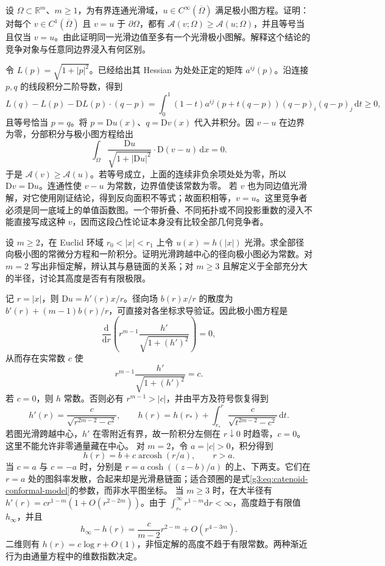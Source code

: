 \begin{exercise}\label{g3:ex:minimal-graph-convex-uniqueness}
	设 \(\Omega\subset\mathbb R^m\)、\(m\ge1\)，为有界连通光滑域，\(u\in C^\infty(\overline\Omega)\) 满足极小图方程。证明：对每个 \(v\in C^1(\overline\Omega)\) 且 \(v=u\) 于 \(\partial\Omega\)，都有 \(\mathcal A(v;\Omega)\ge\mathcal A(u;\Omega)\)，并且等号当且仅当 \(v=u\)。由此证明同一光滑边值至多有一个光滑极小图解。解释这个结论的竞争对象与任意同边界浸入有何区别。
\end{exercise}
\begin{solution}
	令 \(L(p)=\sqrt{1+|p|^2}\)。已经给出其 Hessian 为处处正定的矩阵 \(a^{ij}(p)\)。沿连接 \(p,q\) 的线段积分二阶导数，得到
	\[
		L(q)-L(p)-\mathrm DL(p)\cdot(q-p)
		=\int_0^1(1-t)a^{ij}(p+t(q-p))(q-p)_i(q-p)_j\,\mathrm dt\ge0,
	\]
	且等号恰当 \(p=q\)。将 \(p=\mathrm Du(x)\)、\(q=\mathrm Dv(x)\) 代入并积分。因 \(v-u\) 在边界为零，分部积分与极小图方程给出
	\[
		\int_\Omega\frac{\mathrm Du}{\sqrt{1+|\mathrm Du|^2}}\cdot\mathrm D(v-u)\,\mathrm dx=0.
	\]
	于是 \(\mathcal A(v)\ge\mathcal A(u)\)。若等号成立，上面的连续非负余项处处为零，所以 \(\mathrm Dv=\mathrm Du\)。连通性使 \(v-u\) 为常数，边界值使该常数为零。
	若 \(v\) 也为同边值光滑解，对它使用刚证结论，得到反向面积不等式；故面积相等，\(v=u\)。这里竞争者必须是同一底域上的单值函数图。一个带折叠、不同拓扑或不同投影重数的浸入不能直接写成这种 \(v\)，因而这段凸性论证本身没有比较全部几何竞争者。
\end{solution}

\begin{exercise}\label{g3:ex:radial-minimal-graphs}
	设 \(m\ge2\)，在 Euclid 环域 \(r_0<|x|<r_1\) 上令 \(u(x)=h(|x|)\) 光滑。求全部径向极小图的常微分方程和一阶积分。证明光滑跨越中心的径向极小图必为常数。对 \(m=2\) 写出非恒定解，辨认其与悬链面的关系；对 \(m\ge3\) 且解定义于全部充分大的半径，讨论其高度是否有有限极限。
\end{exercise}
\begin{solution}
	记 \(r=|x|\)，则 \(\mathrm Du=h'(r)x/r\)。径向场 \(b(r)x/r\) 的散度为 \(b'(r)+(m-1)b(r)/r\)，可直接对各坐标求导验证。因此极小图方程是
	\[
		\frac{\mathrm d}{\mathrm dr}\left(r^{m-1}\frac{h'}{\sqrt{1+(h')^2}}\right)=0,
	\]
	从而存在实常数 \(c\) 使
	\[
		r^{m-1}\frac{h'}{\sqrt{1+(h')^2}}=c.
	\]
	若 \(c=0\)，则 \(h\) 常数。否则必有 \(r^{m-1}>|c|\)，并由平方及符号恢复得到
	\[
		h'(r)=\frac{c}{\sqrt{r^{2m-2}-c^2}},\qquad
		h(r)=h(r_*)+\int_{r_*}^r\frac{c}{\sqrt{t^{2m-2}-c^2}}\,\mathrm dt.
	\]
	若图光滑跨越中心，\(h'\) 在零附近有界，故一阶积分左侧在 \(r\downarrow0\) 时趋零，\(c=0\)。这里不能允许非零通量藏在中心。
	对 \(m=2\)，令 \(a=|c|>0\)，积分得到
	\[
		h(r)=b+c\operatorname{arcosh}(r/a),\qquad r>a.
	\]
	当 \(c=a\) 与 \(c=-a\) 时，分别是 \(r=a\cosh((z-b)/a)\) 的上、下两支。它们在 \(r=a\) 处的图斜率发散，合起来却是光滑悬链面；适合颈圈的是式\eqref{g3:eq:catenoid-conformal-model}的参数，而非水平图坐标。
	当 \(m\ge3\) 时，在大半径有
	\(h'(r)=c r^{1-m}(1+O(r^{2-2m}))\)。由于 \(\int_{r_*}^\infty r^{1-m}\mathrm dr<\infty\)，高度趋于有限值 \(h_\infty\)，并且
	\[
		h_\infty-h(r)=\frac{c}{m-2}r^{2-m}+O(r^{4-3m}).
	\]
	二维则有 \(h(r)=c\log r+O(1)\)，非恒定解的高度不趋于有限常数。两种渐近行为由通量方程中的维数指数决定。
\end{solution}

